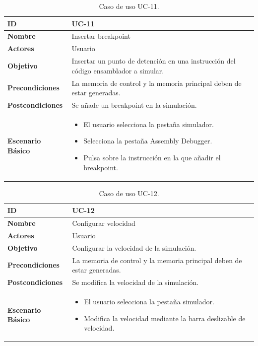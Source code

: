 \begin{center}
\begin{table}[htbp]
\centering
\caption{Caso de uso UC-11.}
\begin{tabular}{@{}p{2.5cm} p{9cm}@{}} 
\toprule
\textbf{ID}	& UC-11  \\
\midrule
\textbf{Nombre} 		& Insertar breakpoint  \\
\midrule
\textbf{Actores} 		&	Usuario  \\
\midrule
\textbf{Objetivo} 	&	Insertar un punto de detención en una instrucción del código \gls{ensamblador} a simular.	 \\
\midrule
\textbf{Precondiciones}	&	La memoria de control y la memoria principal deben de estar generadas.  \\
\midrule
\textbf{Postcondiciones} 	& Se añade un breakpoint en la simulación.   \\
\midrule
\textbf{Escenario Básico} 	&  \begin{itemize}
\item El usuario selecciona la pestaña simulador.
\item Selecciona la pestaña Assembly Debugger.
\item Pulsa sobre la instrucción en la que añadir el breakpoint.
\end{itemize} \\
\bottomrule
\end{tabular}
\label{tab:uc11}
\end{table}
\end{center}

\begin{center}
\begin{table}[htbp]
\centering
\caption{Caso de uso UC-12.}
\begin{tabular}{@{}p{2.5cm} p{9cm}@{}} 
\toprule
\textbf{ID}	& UC-12  \\
\midrule
\textbf{Nombre} 		& Configurar velocidad  \\
\midrule
\textbf{Actores} 		&	Usuario  \\
\midrule
\textbf{Objetivo} 	&	Configurar la velocidad de la simulación.	 \\
\midrule
\textbf{Precondiciones}	&	La memoria de control y la memoria principal deben de estar generadas.  \\
\midrule
\textbf{Postcondiciones} 	& Se modifica la velocidad de la simulación.   \\
\midrule
\textbf{Escenario Básico} 	&  \begin{itemize}
\item El usuario selecciona la pestaña simulador.
\item Modifica la velocidad mediante la barra deslizable de velocidad.
\end{itemize} \\
\bottomrule
\end{tabular}
\label{tab:uc12}
\end{table}
\end{center}


